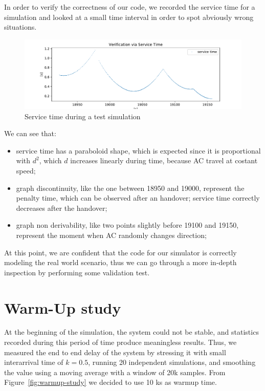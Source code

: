 \documentclass[a4paper,12pt]{article}
\begin{document}
In order to verify the correctness of our code, we recorded the service time for a simulation and looked at a small time interval in order to spot abviously wrong situations.

\begin{figure}[H]
  \centering
  \includegraphics[scale=0.6]{img/verification-via-service-time.pdf}
  \caption{Service time during a test simulation}
  \label{fig:verification-via-service-time}
\end{figure}

We can see that:
\begin{itemize}
  \item service time has a paraboloid shape, which is expected since it is proportional with $d^2$, which $d$ increases linearly during time, because AC travel at costant speed;
  \item graph discontinuity, like the one between 18950 and 19000, represent the penalty time, which can be observed after an handover; service time correctly decreases after the handover;
  \item graph non derivability, like two points slightly before 19100 and 19150, represent the moment when AC randomly changes direction;
\end{itemize}

At this point, we are confident that the code for our simulator is correctly modeling the real world scenario, thus we can go through a more in-depth inspection by performing some validation test.

\section{Warm-Up study}
At the beginning of the simulation, the system could not be stable, and statistics recorded during this period of time produce meaningless results.
Thus, we measured the end to end delay of the system by stressing it with small interarrival time of $k=0.5$, running 20 independent simulations, and smoothing the value using a moving average with a window of 20k samples.
From Figure~\ref{fig:warmup-study} we decided to use 10 ks as warmup time.
\end{document}
